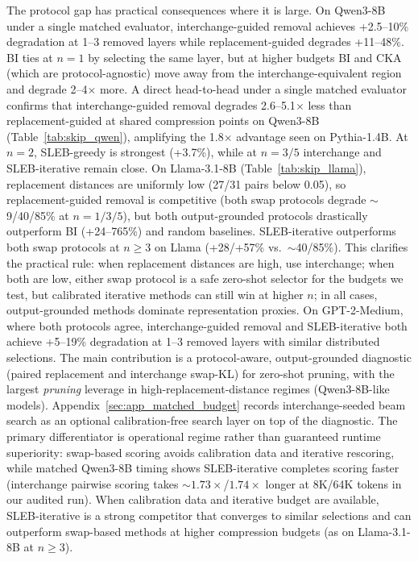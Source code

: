\documentclass{article}
\begin{document}
The protocol gap has practical consequences where it is large. On Qwen3-8B under a single matched evaluator, interchange-guided removal achieves +2.5--10\% degradation at 1--3 removed layers while replacement-guided degrades +11--48\%. BI ties at $n{=}1$ by selecting the same layer, but at higher budgets BI and CKA (which are protocol-agnostic) move away from the interchange-equivalent region and degrade 2--4$\times$ more. A direct head-to-head under a single matched evaluator confirms that interchange-guided removal degrades 2.6--5.1$\times$ less than replacement-guided at shared compression points on Qwen3-8B (Table~\ref{tab:skip_qwen}), amplifying the 1.8$\times$ advantage seen on Pythia-1.4B. At $n{=}2$, SLEB-greedy is strongest (+3.7\%), while at $n{=}3/5$ interchange and SLEB-iterative remain close. On Llama-3.1-8B (Table~\ref{tab:skip_llama}), replacement distances are uniformly low (27/31 pairs below 0.05), so replacement-guided removal is competitive (both swap protocols degrade $\sim$9/40/85\% at $n{=}1/3/5$), but both output-grounded protocols drastically outperform BI (+24--765\%) and random baselines. SLEB-iterative outperforms both swap protocols at $n{\geq}3$ on Llama (+28/+57\% vs.~$\sim$40/85\%). This clarifies the practical rule: when replacement distances are high, use interchange; when both are low, either swap protocol is a safe zero-shot selector for the budgets we test, but calibrated iterative methods can still win at higher $n$; in all cases, output-grounded methods dominate representation proxies. On GPT-2-Medium, where both protocols agree, interchange-guided removal and SLEB-iterative both achieve +5--19\% degradation at 1--3 removed layers with similar distributed selections. The main contribution is a protocol-aware, output-grounded diagnostic (paired replacement and interchange swap-KL) for zero-shot pruning, with the largest \emph{pruning} leverage in high-replacement-distance regimes (Qwen3-8B-like models). Appendix~\ref{sec:app_matched_budget} records interchange-seeded beam search as an optional calibration-free search layer on top of the diagnostic. The primary differentiator is operational regime rather than guaranteed runtime superiority: swap-based scoring avoids calibration data and iterative rescoring, while matched Qwen3-8B timing shows SLEB-iterative completes scoring faster (interchange pairwise scoring takes ${\sim}1.73\times$/$1.74\times$ longer at 8K/64K tokens in our audited run). When calibration data and iterative budget are available, SLEB-iterative is a strong competitor that converges to similar selections and can outperform swap-based methods at higher compression budgets (as on Llama-3.1-8B at $n{\geq}3$).
\end{document}
